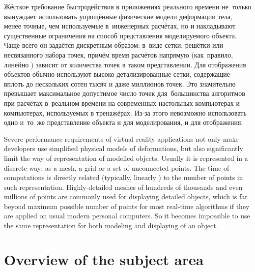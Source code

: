 \documentclass[a4paper, 12pt, titlepage]{extarticle}
\begin{document}
\begin{original}
    Жёсткое требование быстродействия в приложениях реального времени не~только вынуждает
    использовать упрощённые физические модели деформации тела, менее точные, чем используемые
    в~инженерных расчётах, но и накладывают существенные ограничения на способ представления
    моделируемого объекта. Чаще всего он задаётся дискретным образом: в~виде сетки, решётки или
    несвязанного набора точек, причём время расчётов напрямую (как~правило, линейно
    \cite{mueller-meshless}) зависит от количества точек в таком представлении. Для отображения
    объектов обычно используют высоко детализированные сетки, содержащие вплоть до нескольких
    сотен тысяч и даже миллионов точек. Это значительно превышает максимальное допустимое число точек для~большинства
    алгоритмов \cite{mueller-stable, mueller-meshless, chang-crash} при расчётах в~реальном времени на
    современных настольных компьютерах и компьютерах, используемых в тренажёрах. Из-за этого
    невозможно использовать одно и~то~же представление объекта и для моделирования, и для
    отображения.
\end{original}

    Severe performance requirements of virtual reality applications not only make developers use
    simplified physical models of deformations, but also significantly limit the way of
    representation of modelled objects. Usually it is represented in a discrete way: as a mesh, a
    grid or a set of unconnected points. The time of computations is directly related (typically,
    linearly \cite{mueller-meshless}) to the number of points in such representation.
    Highly-detailed meshes of hundreds of thousands and even millions of points are commonly used
    for displaying detailed objects, which is far beyond maximum possible number of points for most
    real-time algorithms \cite{mueller-stable, mueller-meshless, chang-crash} if they are applied on
    usual modern personal computers. So it becomes impossible to use the same representation for
    both modeling and displaying of an object.


  \section{Overview of the subject area}\label{sec:domain}
\end{document}
